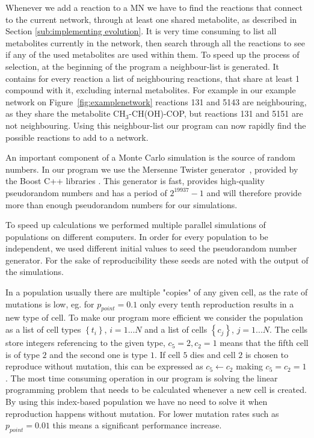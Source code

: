 \documentclass[a4paper,12pt]{article}
\begin{document}
	Whenever we add a reaction to a MN we have to find the reactions that connect to the current network, through at least one shared metabolite, as described in Section \ref{sub:implementing evolution}. It is very time consuming to list all metabolites currently in the network, then search through all the reactions to see if any of the used metabolites are used within them. To speed up the process of selection, at the beginning of the program a neighbour-list is generated. It contains for every reaction a list of neighbouring reactions, that share at least 1 compound with it, excluding internal metabolites. For example in our example network on Figure~\ref{fig:examplenetwork} reactions 131 and 5143 are neighbouring, as they share the metabolite CH$_3$-CH(OH)-COP, but reactions 131 and 5151 are not neighbouring. Using this neighbour-list our program can now rapidly find the possible reactions to add to a network. 

	An important component of a Monte Carlo simulation is the source of random numbers. In our program we use the Mersenne Twister generator~\cite{mersennetwister}, provided by the Boost C++ libraries \cite{boostlibraries}. This generator is fast, provides high-quality pseudorandom numbers and has a period of $2^{19937}-1$ and will therefore provide more than enough pseudorandom numbers for our simulations.

	To speed up calculations we performed multiple parallel simulations of populations on different computers. In order for every population to be independent, we used different initial values to seed the pseudorandom number generator. For the sake of reproducibility these seeds are noted with the output of the simulations. 

In a population usually there are multiple "copies" of any given cell, as the rate of mutations is low, eg. for $p_{point}=0.1$ only every tenth reproduction results in a new type of cell. To make our program more efficient we consider the population as a list of cell types $ \left\{ t_i \right\}$, $i=1...N$ and a list of cells $\left\{ c_j \right\}$, $j=1...N$. The cells store integers referencing to the given type, $c_5=2, c_2=1$ means that the fifth cell is of type $2$ and the second one is type $1$. If cell $5$ dies and cell $2$ is chosen to reproduce without mutation, this can be expressed as $c_5 \leftarrow c_2$ making $c_5=c_2=1$. The most time consuming operation in our program is solving the linear programming problem that needs to be calculated whenever a new cell is created. By using this index-based population we have no need to solve it when reproduction happens without mutation. For lower mutation rates such as $p_{point}=0.01$ this means a significant performance increase. 
\end{document}
